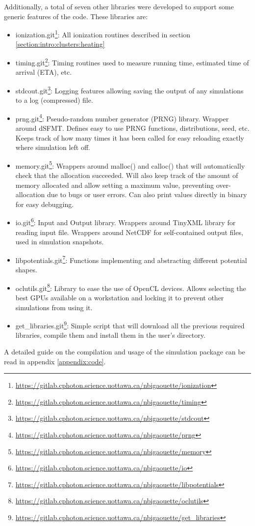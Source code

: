 Additionally, a total of seven other libraries were developed to support some
generic features of the code. These libraries are:
\begin{itemize}
\item ionization.git\footnote{ \url{
    https://gitlab.cphoton.science.uottawa.ca/nbigaouette/ionization}}:
    All ionization routines described in section
    \ref{section:intro:clusters:heating}
\item timing.git\footnote{ \url{
    https://gitlab.cphoton.science.uottawa.ca/nbigaouette/timing}}:
    Timing routines used to measure running time, estimated time of arrival
(ETA), etc.
\item stdcout.git\footnote{ \url{
    https://gitlab.cphoton.science.uottawa.ca/nbigaouette/stdcout}}:
    Logging features allowing saving the output of any simulations to a log
    (compressed) file.
\item prng.git\footnote{ \url{
    https://gitlab.cphoton.science.uottawa.ca/nbigaouette/prng}}:
    Pseudo-random number generator (PRNG) library. Wrapper around
dSFMT\cite{prng2009}. Defines easy to use PRNG functions, distributions, seed,
etc. Keeps track of how many times it has been called for easy reloading
exactly where simulation left off.
\item memory.git\footnote{ \url{
    https://gitlab.cphoton.science.uottawa.ca/nbigaouette/memory}}:
    Wrappers around malloc() and calloc() that will automatically check that
    the allocation succeeded. Will also keep track of the amount of
    memory allocated and allow setting a maximum value, preventing
    over-allocation due to bugs or user errors. Can also print values directly
    in binary for easy debugging.
\item io.git\footnote{ \url{
    https://gitlab.cphoton.science.uottawa.ca/nbigaouette/io}}:
    Input and Output library. Wrappers around TinyXML library\cite{tinyxml} for
reading input file. Wrappers around NetCDF\cite{netcdf} for self-contained
output files, used in simulation snapshots.
\item libpotentials.git\footnote{ \url{
    https://gitlab.cphoton.science.uottawa.ca/nbigaouette/libpotentials}}:
    Functions implementing and abstracting different potential shapes.
\item oclutils.git\footnote{ \url{
    https://gitlab.cphoton.science.uottawa.ca/nbigaouette/oclutils}}:
    Library to ease the use of OpenCL devices. Allows selecting the best GPUs
    available on a workstation and locking it to prevent other simulations from
    using it.
\item get\_libraries.git\footnote{ \url{
    https://gitlab.cphoton.science.uottawa.ca/nbigaouette/get_libraries}}:
    Simple script that will download all the previous required libraries,
    compile them and install them in the user's directory.
\end{itemize}
A detailed guide on the compilation and usage of the simulation package can be
read in appendix \ref{appendix:code}.






